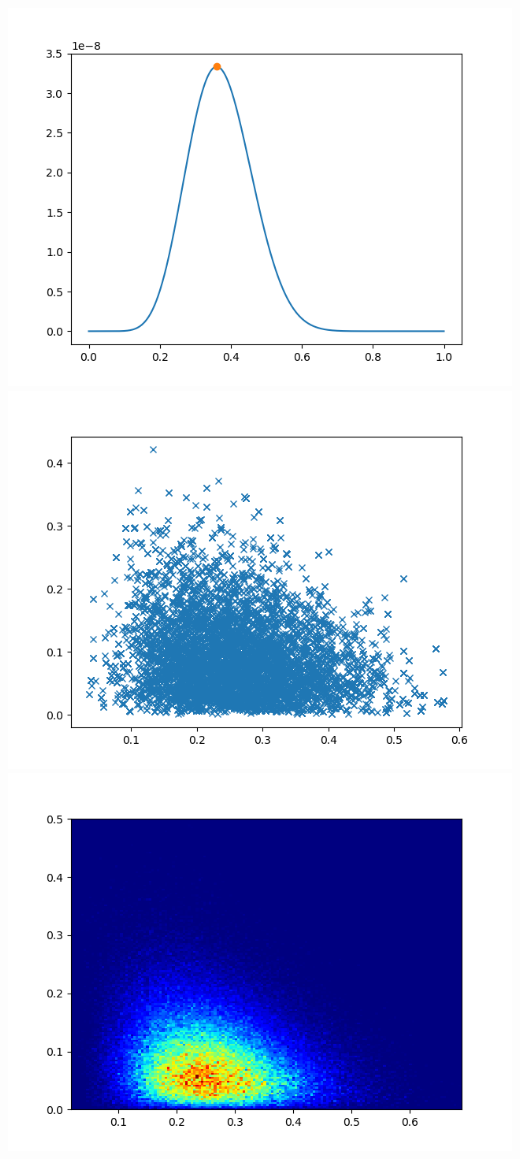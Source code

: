 \documentclass[pt12]{article}
\begin{document}
\newpage

\begin{center}
\includegraphics[scale=0.5]{hip19.png}\\
\includegraphics[scale=0.5]{sc19.png}\\
\includegraphics[scale=0.5]{den19.png}\\
\end{center}
\end{document}
